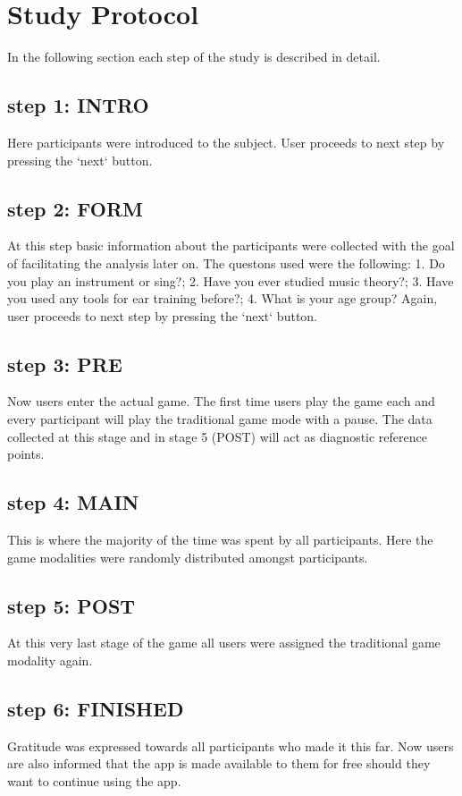 \section{Study Protocol}
In the following section each step of the study is described in detail.

\subsection{step 1: INTRO}
Here participants were introduced to the subject. User proceeds to next step by pressing the `next` button.

\subsection{step 2: FORM}
At this step basic information about the participants were collected with the goal of facilitating the analysis later on. The questons used were the following: 1. Do you play an instrument or sing?; 2. Have you ever studied music theory?; 3. Have you used any tools for ear training before?; 4. What is your age group?
Again, user proceeds to next step by pressing the `next` button.

\subsection{step 3: PRE}
Now users enter the actual game. The first time users play the game each and every participant will play the traditional game mode with a pause. The data collected at this stage and in stage 5 (POST) will act as diagnostic reference points.

\subsection{step 4: MAIN}
This is where the majority of the time was spent by all participants. Here the game modalities were randomly distributed amongst participants.

\subsection{step 5: POST}
At this very last stage of the game all users were assigned the traditional game modality again.

\subsection{step 6: FINISHED}
Gratitude was expressed towards all participants who made it this far. Now users are also informed that the app is made available to them for free should they want to continue using the app.

